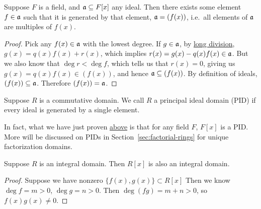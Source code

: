 \begin{corollary}\label{cor:field-polynomial-pid}
    Suppose \(F\) is a field,
    and \(\mathfrak{a} \subseteq F[x]\) any ideal.
    Then there exists some element \(f \in \mathfrak{a}\)
    such that it is generated by that element, \(\mathfrak{a} = (f(x))\),
    i.e.\ all elements of \(\mathfrak{a}\) are multiples of \(f(x)\).
\end{corollary}
\begin{proof}
    Pick any \(f(x) \in \mathfrak{a}\) with the lowest degree.
    If \(g \in \mathfrak{a}\), by \hyperref[prop:field-polynomial-long-div]{long division},
    \(g(x) = q(x)f(x) + r(x)\), which implies \(r(x) = g(x) - q(x)f(x) \in \mathfrak{a}\).
    But we also know that \(\deg r < \deg f\),
    which tells us that \(r(x) = 0\),
    giving us \(g(x) = q(x)f(x) \in (f(x))\), and hence \(\mathfrak{a} \subseteq (f(x))\).
    By definition of ideals, \((f(x)) \subseteq \mathfrak{a}\).
    Therefore \((f(x)) = \mathfrak{a}\).
\end{proof}

\begin{definition}
    Suppose \(R\) is a commutative domain.
    We call \(R\) a principal ideal domain (PID)
    if every ideal is generated by a single element.
\end{definition}
\begin{remark}
    In fact, what we have just proven \hyperref[cor:field-polynomial-pid]{above}
    is that for any field \(F\), \(F[x]\) is a PID.\@
    More will be discussed on PIDs
    in Section~\ref{sec:factorial-rings} for unique factorization domains.
\end{remark}

\begin{proposition}\label{prop:polynomial-domain}
    Suppose \(R\) is an integral domain.
    Then \(R[x]\) is also an integral domain.
\end{proposition}
\begin{proof}
    Suppose we have nonzero \(\{f(x),g(x)\} \subset R[x]\)
    Then we know \(\deg f = m > 0\), \(\deg g = n > 0\).
    Then \(\deg(fg) = m+n > 0\),
    so \(f(x)g(x) \neq 0\).
\end{proof}

